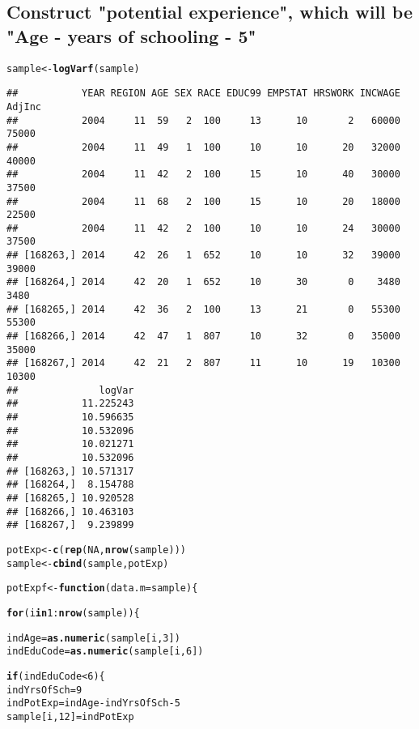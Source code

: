 \documentclass{article}\usepackage[]{graphicx}\usepackage[]{color}
\makeatletter
\newcommand{\hlnum}[1]{\textcolor[rgb]{0.686,0.059,0.569}{#1}}%
\newcommand{\hlopt}[1]{\textcolor[rgb]{0,0,0}{#1}}%
\newcommand{\hlstd}[1]{\textcolor[rgb]{0.345,0.345,0.345}{#1}}%
\newcommand{\hlkwa}[1]{\textcolor[rgb]{0.161,0.373,0.58}{\textbf{#1}}}%
\newcommand{\hlkwb}[1]{\textcolor[rgb]{0.69,0.353,0.396}{#1}}%
\newcommand{\hlkwc}[1]{\textcolor[rgb]{0.333,0.667,0.333}{#1}}%
\newcommand{\hlkwd}[1]{\textcolor[rgb]{0.737,0.353,0.396}{\textbf{#1}}}%
\newenvironment{kframe}{%
 \def\at@end@of@kframe{}%
 \ifinner\ifhmode%
  \def\at@end@of@kframe{\end{minipage}}%
  \begin{minipage}{\columnwidth}%
 \fi\fi%
 \def\FrameCommand##1{\hskip\@totalleftmargin \hskip-\fboxsep
 \colorbox{shadecolor}{##1}\hskip-\fboxsep
     \hskip-\linewidth \hskip-\@totalleftmargin \hskip\columnwidth}%
 \MakeFramed {\advance\hsize-\width
   \@totalleftmargin\z@ \linewidth\hsize
   \@setminipage}}%
 {\par\unskip\endMakeFramed%
 \at@end@of@kframe}
\newenvironment{knitrout}{}{} %
\makeatother
\begin{document}
\subsection{Construct "potential experience", which will be "Age - years of schooling - 5"}

\begin{knitrout}
\color{fgcolor}\begin{kframe}
\begin{alltt}
\hlstd{sample} \hlkwb{<-} \hlkwd{logVarf}\hlstd{(sample)}
\end{alltt}
\begin{verbatim}
##           YEAR REGION AGE SEX RACE EDUC99 EMPSTAT HRSWORK INCWAGE AdjInc
##           2004     11  59   2  100     13      10       2   60000  75000
##           2004     11  49   1  100     10      10      20   32000  40000
##           2004     11  42   2  100     15      10      40   30000  37500
##           2004     11  68   2  100     15      10      20   18000  22500
##           2004     11  42   2  100     10      10      24   30000  37500
## [168263,] 2014     42  26   1  652     10      10      32   39000  39000
## [168264,] 2014     42  20   1  652     10      30       0    3480   3480
## [168265,] 2014     42  36   2  100     13      21       0   55300  55300
## [168266,] 2014     42  47   1  807     10      32       0   35000  35000
## [168267,] 2014     42  21   2  807     11      10      19   10300  10300
##              logVar
##           11.225243
##           10.596635
##           10.532096
##           10.021271
##           10.532096
## [168263,] 10.571317
## [168264,]  8.154788
## [168265,] 10.920528
## [168266,] 10.463103
## [168267,]  9.239899
\end{verbatim}
\begin{alltt}
\hlstd{potExp} \hlkwb{<-} \hlkwd{c}\hlstd{(}\hlkwd{rep}\hlstd{(}\hlnum{NA}\hlstd{,} \hlkwd{nrow}\hlstd{(sample)))}
\hlstd{sample} \hlkwb{<-} \hlkwd{cbind}\hlstd{(sample, potExp)}

\hlstd{potExpf} \hlkwb{<-} \hlkwa{function}\hlstd{(}\hlkwc{data.m} \hlstd{= sample)\{}

  \hlkwa{for} \hlstd{(i} \hlkwa{in} \hlnum{1}\hlopt{:}\hlkwd{nrow}\hlstd{(sample))\{}

    \hlstd{indAge} \hlkwb{=} \hlkwd{as.numeric}\hlstd{(sample[i,}\hlnum{3}\hlstd{])}
    \hlstd{indEduCode} \hlkwb{=} \hlkwd{as.numeric}\hlstd{(sample[i,}\hlnum{6}\hlstd{])}

    \hlkwa{if} \hlstd{(indEduCode} \hlopt{<} \hlnum{6}\hlstd{)\{}
      \hlstd{indYrsOfSch} \hlkwb{=} \hlnum{9}
      \hlstd{indPotExp} \hlkwb{=} \hlstd{indAge} \hlopt{-} \hlstd{indYrsOfSch} \hlopt{-} \hlnum{5}
      \hlstd{sample[i,}\hlnum{12}\hlstd{]} \hlkwb{=} \hlstd{indPotExp}


\end{alltt}
\end{kframe}
\end{knitrout}
\end{document}
